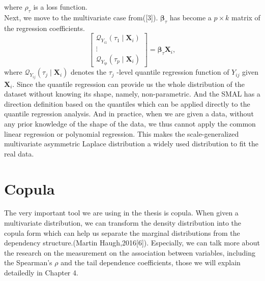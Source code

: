 \documentclass[mstat,12pt]{unswthesis}  %
\numberwithin{equation}{section}
\begin{document}
where $\rho_\tau$ is a loss function.\\
Next, we move to the multivariate case from([3]). $\boldsymbol{\beta}_{\tau}$ has become a $p \times k$ matrix of the regression coefficients.
\begin{equation}
\left[\begin{array}{c}
\mathcal{Q}_{Y_{i 1}}\left(\tau_{1} \mid \boldsymbol{X}_{i}\right) \\
\vdots \\
\mathcal{Q}_{Y_{i p}}\left(\tau_{p} \mid \boldsymbol{X}_{i}\right)
\end{array}\right]=\boldsymbol{\beta}_{\tau} \boldsymbol{X}_{i},
\end{equation}
where $\mathcal{Q}_{Y_{i j}}\left(\tau_{j} \mid \boldsymbol{X}_{i}\right)$ denotes the $\tau_{j}$ -level quantile regression function of $Y_{i j}$ given $\boldsymbol{X}_{i} .$
Since the quantile regression can provide us the whole distribution of the dataset without knowing its shape, namely, non-parametric. And the SMAL has a direction definition based on the quantiles which can be applied directly to the quantile regression analysis. And in practice, when we are given a data, without any prior knowledge of the shape of the data, we thus cannot apply the common linear regression or polynomial regression. This makes the scale-generalized multivariate asymmetric Laplace distribution a widely used distribution to fit the real data.
\chapter{Copula}
The very important tool we are using in the thesis is copula. When given a multivariate distribution, we can transform the density distribution into the copula form which can help us separate the marginal distributions from the dependency structure.(Martin Haugh,2016[6]). Especially, we can talk more about the research on the measurement on the association between variables, including the Spearman's $\rho$ and the tail dependence coefficients, those we will explain detailedly in Chapter 4.
\end{document}
